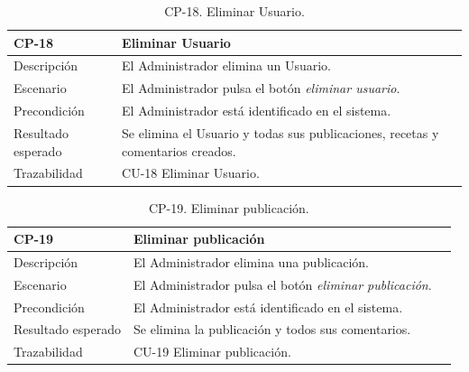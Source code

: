                     \begin{table}[H]
                        \centering
                        \begin{tabularx}{1\textwidth} { 
                            | >{\raggedright\arraybackslash}X 
                            | >{\raggedright\arraybackslash}X 
                            | >{\raggedright\arraybackslash}X 
                            |  }
                        \hline
                        \textbf{CP-18}     & \textbf{Eliminar Usuario}                             \\ \hline
                        Descripción        & El Administrador elimina un Usuario.      \\ \hline
                        Escenario          & El Administrador pulsa el botón \textit{eliminar usuario}.                           \\ \hline
                        Precondición          & El Administrador está identificado en el sistema.                             \\ \hline
                       
                        Resultado esperado & Se elimina el Usuario y todas sus publicaciones, recetas y comentarios creados. \\ \hline
                        Trazabilidad & CU-18 Eliminar Usuario.\\ \hline
                    \end{tabularx}
                    \caption{CP-18. Eliminar Usuario.}
                    \label{table:CP-18}
                        \end{table}


                \begin{table}[H]
                    \centering
                    \begin{tabularx}{1\textwidth} { 
                        | >{\raggedright\arraybackslash}X 
                        | >{\raggedright\arraybackslash}X 
                        | >{\raggedright\arraybackslash}X 
                        |  }
                    \hline
                    \textbf{CP-19}     & \textbf{Eliminar publicación}                             \\ \hline
                    Descripción        & El Administrador elimina una publicación.      \\ \hline
                    Escenario          & El Administrador pulsa el botón \textit{eliminar publicación}.                          \\ \hline
                    Precondición          & El Administrador está identificado en el sistema.                             \\ \hline
                  
                    Resultado esperado & Se elimina la publicación y todos sus comentarios. \\ \hline
                    Trazabilidad & CU-19 Eliminar publicación.\\ \hline
                \end{tabularx}
                \caption{CP-19. Eliminar publicación.}
                \label{table:CP-19}
                    \end{table}


